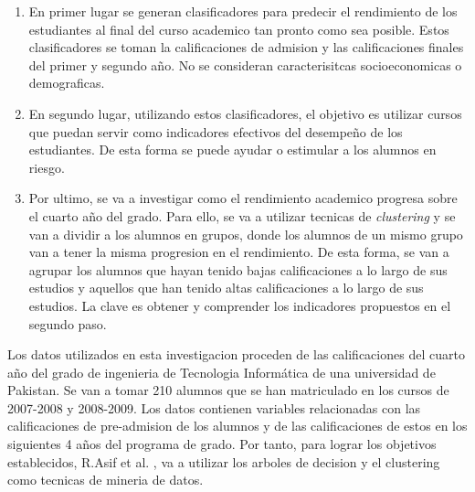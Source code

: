 \documentclass[spanish,12pt, a4paper,twoside]{paper}
\begin{document}
\begin{enumerate}
\item En primer lugar se generan clasificadores para predecir el rendimiento de los estudiantes al final del curso academico tan pronto como sea posible. Estos clasificadores se toman la calificaciones de admision y las calificaciones finales del primer y segundo año. No se consideran caracterisitcas socioeconomicas o demograficas.
\item En segundo lugar, utilizando estos clasificadores, el objetivo es utilizar cursos que puedan servir como indicadores efectivos del desempeño de los estudiantes. De esta forma se puede ayudar o estimular a los alumnos en riesgo.
\item Por ultimo, se va a investigar como el rendimiento academico progresa sobre el cuarto año del grado. Para ello, se va a utilizar tecnicas de \textit{clustering} y se van a dividir a los alumnos en grupos, donde los alumnos de un mismo grupo van a tener la misma progresion en el rendimiento. De esta forma, se van a agrupar los alumnos que hayan tenido bajas calificaciones a lo largo de sus estudios y aquellos que han tenido altas calificaciones a lo largo de sus estudios. La clave es obtener y comprender los indicadores propuestos en el segundo paso.
\end{enumerate}
\justify
Los datos utilizados en esta investigacion proceden de las calificaciones del cuarto año del grado de ingenieria de Tecnologia Informática de una universidad de Pakistan. Se van a tomar 210 alumnos que se han matriculado en los cursos de 2007-2008 y 2008-2009. Los datos contienen variables relacionadas con las calificaciones de pre-admision de los alumnos y de las calificaciones de estos en los siguientes 4 años del programa de grado.
Por tanto, para lograr los objetivos establecidos, R.Asif et al. \cite{AsifR2017}, va a utilizar los arboles de decision y el clustering como tecnicas de mineria de datos.
\justify
\end{document}
